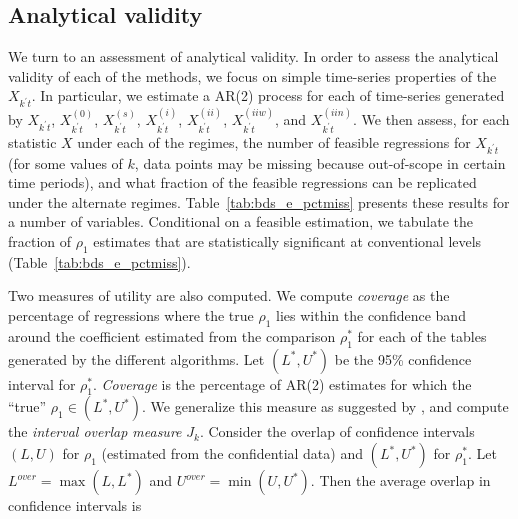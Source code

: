 \subsection{Analytical validity}
\label{sec:validity}
We turn to an assessment of analytical validity. In order to assess the analytical validity of each of 
the methods, we focus on simple 
time-series 
properties of  the $X_{k^\prime t}$. 
In particular, we 
estimate a AR(2) process for each of time-series generated by 
$X_{k^\prime t}$, $X_{k^\prime t}^{(0)}$, $X_{k^\prime t}^{(s)}$,  $X_{k^\prime t}^{(i)}$, $X_{k^\prime t}^{(ii)}$,   
$X_{k^\prime t}^{(iiw)}$, and $X_{k^\prime t}^{(iin)}$. 
We then assess, for each statistic $X$ under each of the regimes, the number of feasible regressions for $X_{k^\prime t}$ (for some values of $k$, data points may be missing because out-of-scope in certain time periods), and what fraction of the feasible regressions can be replicated under the alternate regimes. Table~\ref{tab:bds_e_pctmiss} presents these results for a number of variables.
Conditional on a feasible estimation, we tabulate the fraction of $\rho_1$ estimates that are 
statistically significant at conventional levels (Table~\ref{tab:bds_e_pctmiss}).


%
%

Two measures of utility are also computed.
We compute \emph{coverage} as the 
percentage of regressions where the true $\rho_1$ lies within the confidence band around the 
coefficient estimated from the comparison $\rho_1^{*}$ for each of the tables generated by the 
different algorithms. Let $(L^{*},U^{*})$ be the 95\% confidence interval for $\rho_1^{*}$. 
\emph{Coverage} is the percentage of AR(2) estimates for which the ``true'' $\rho_1 \in  
(L^{*},U^{*})$. We 
generalize this measure  as suggested by \cite{tas2006}, and compute  the \emph{interval 
overlap measure} $J_k$. Consider the overlap of confidence intervals $(L,U)$ for $\rho_1$ (estimated from the confidential data) and $(L^{*},U^{*})$ for $\rho_1^*$. Let $L^{over} = \max (L,L^{*} )$ and $U^{over} = \min (U,U^{*})$. Then the average overlap in confidence intervals is

